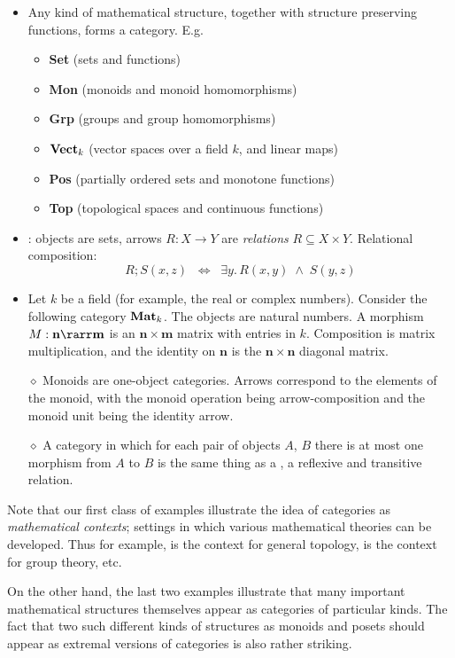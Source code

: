 \documentclass[12pt]{article}
\begin{document}
\begin{itemize}
\item {Any kind of mathematical structure, together with structure preserving functions, forms a category. E.g.}
\begin{itemize}
\item {\textbf{Set} (sets and functions)}
\item {\textbf{Mon} (monoids and monoid homomorphisms)}
\item {\textbf{Grp} (groups and group homomorphisms)}
\item {$\text{\textbf{Vect}}_{k}$ (vector spaces over a field $k$, and linear maps)}
\item {\textbf{Pos} (partially ordered sets and monotone functions)}
\item {\textbf{Top} (topological spaces and continuous functions)}
\end{itemize}
\item \Rel: objects are sets, arrows $R : X \rightarrow Y$ are \emph{relations} $R \subseteq X \times Y$.
Relational composition:
\[ R;S (x, z) \;\; \Longleftrightarrow \;\; \exists y. \, R(x, y) \; \wedge \; S(y, z) \]
\item Let $k$ be a field (for example, the real or complex numbers). Consider the following category $\text{\textbf{Mat}}_{k}$. The objects are natural numbers. A morphism $M : \mathbf{n} \rarr \mathbf{m}$ is an $\mathbf{n} \times \mathbf{m}$ matrix with entries in $k$. Composition is matrix multiplication, and the identity on $\mathbf{n}$ is the $\mathbf{n} \times \mathbf{n}$ diagonal matrix.
\item[$\diamond$] Monoids are one-object categories. Arrows correspond to the elements of the monoid, with the monoid operation being arrow-composition
    and the monoid unit being the identity arrow.
\item[$\diamond$] {A category in which for each pair of objects $A$, $B$ there is at most one morphism from $A$ to $B$ is the same thing as a
  , \ie a reflexive and transitive relation.}
\end{itemize}
Note that our first class of examples illustrate the idea of categories as \emph{mathematical contexts}; settings in which various mathematical theories can be developed. Thus for example,  is the context for general topology,  is the context for group theory, etc.

On the other hand, the last two examples illustrate that many important mathematical structures themselves appear as categories of particular kinds. The fact that two such different kinds of structures as monoids and posets should appear as extremal versions of categories is also rather striking.
\end{document}
